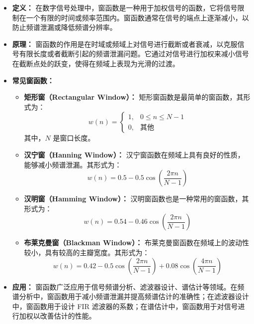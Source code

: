 \documentclass[a4paper,12pt]{article}
\begin{document}
\begin{itemize}
    \item \textbf{定义：} 在数字信号处理中，窗函数是一种用于加权信号的函数，它将信号限制在一个有限的时间或频率范围内。窗函数通常在信号的端点上逐渐减小，以防止频谱泄漏或降低频谱分辨率。
    
    \item \textbf{原理：} 窗函数的作用是在时域或频域上对信号进行截断或者衰减，以克服信号有限长度或者截断引起的频谱泄漏问题。它通过对信号进行加权来减小信号在截断点处的跃变，使得在频域上表现为光滑的过渡。
    
    \item \textbf{常见窗函数：}
        \begin{itemize}
            \item \textbf{矩形窗（Rectangular Window）：} 矩形窗函数是最简单的窗函数，其形式为：
            \begin{equation}
                w(n) = \begin{cases} 1, & 0 \leq n \leq N-1 \\ 0, & \text{其他} \end{cases}
            \end{equation}
            其中，\( N \) 是窗口长度。
            
            \item \textbf{汉宁窗（Hanning Window）：} 汉宁窗函数在频域上具有良好的性质，能够减小频谱泄漏。其形式为：
            \begin{equation}
                w(n) = 0.5 - 0.5 \cos\left( \frac{2\pi n}{N-1} \right)
            \end{equation}
            
            \item \textbf{汉明窗（Hamming Window）：} 汉明窗函数也是一种常用的窗函数，其形式为：
            \begin{equation}
                w(n) = 0.54 - 0.46 \cos\left( \frac{2\pi n}{N-1} \right)
            \end{equation}
            
            \item \textbf{布莱克曼窗（Blackman Window）：} 布莱克曼窗函数在频域上的波动性较小，具有较高的主瓣宽度。其形式为：
            \begin{equation}
                w(n) = 0.42 - 0.5 \cos\left( \frac{2\pi n}{N-1} \right) + 0.08 \cos\left( \frac{4\pi n}{N-1} \right)
            \end{equation}
        \end{itemize}
    
    \item \textbf{应用：} 窗函数广泛应用于信号频谱分析、滤波器设计、谱估计等领域。在频谱分析中，窗函数用于减小频谱泄漏并提高频谱估计的准确性；在滤波器设计中，窗函数用于设计 FIR 滤波器的系数；在谱估计中，窗函数用于对信号进行加权以改善估计的性能。
\end{itemize}
\end{document}

